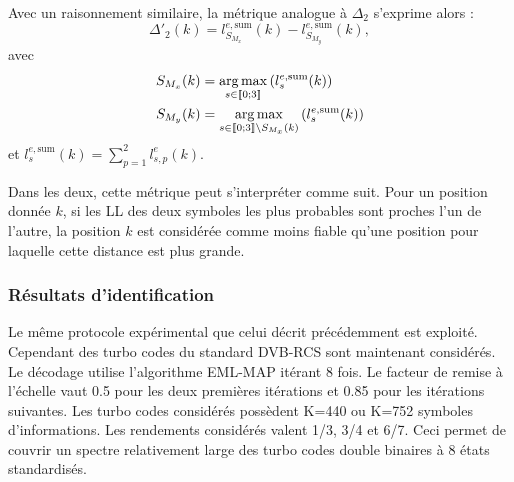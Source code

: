 Avec un raisonnement similaire, la métrique analogue à $\Delta_2$ s'exprime alors : 
\begin{equation}
	\Delta'_2(k) = l^{e,\text{sum}}_{S_{M_x}}(k)-l^{e,\text{sum}}_{S_{M_y}}(k),
\end{equation}
avec
\begin{align*}
S_{M_x}(k) &= \operatorname*{arg\,max}\limits_{s\in\llbracket0;3\rrbracket}\left(l^{e,\text{sum}}_s(k)\right) \\
S_{M_y}(k) &= \operatorname*{arg\,max}\limits_{s\in\llbracket0;3\rrbracket\setminus{S_{M_x}(k)}}\left(l^{e,\text{sum}}_s(k)\right)
\end{align*}
et $l^{e,\text{sum}}_s(k) = \sum\limits_{p=1}^2l^e_{s,p}(k)$.

Dans les deux, cette métrique peut s'interpréter comme suit. Pour un position donnée $k$, si les LL des deux symboles les 
plus probables sont proches l'un de l'autre, la position $k$ est considérée comme moins fiable qu'une position pour
laquelle cette distance est plus grande.

\subsubsection{Résultats d'identification}
Le même protocole expérimental que celui décrit précédemment est exploité. Cependant des turbo codes du standard DVB-RCS
sont maintenant considérés. Le décodage utilise l'algorithme EML-MAP itérant 8 fois. Le facteur de remise à l'échelle 
vaut 0.5 pour les deux premières itérations et 0.85 pour les itérations suivantes. Les turbo codes considérés possèdent K=440
ou K=752 symboles d'informations. Les rendements considérés valent 1/3, 3/4 et 6/7. Ceci permet de couvrir un spectre 
relativement large des turbo codes double binaires à 8 états standardisés. 

